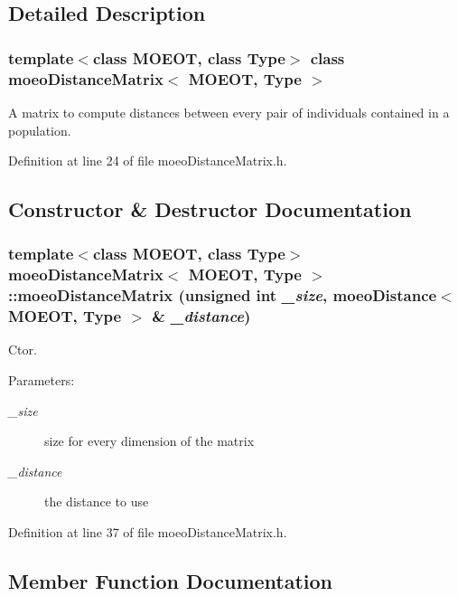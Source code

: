 \subsection{Detailed Description}
\subsubsection*{template$<$class MOEOT, class Type$>$ class moeo\-Distance\-Matrix$<$ MOEOT, Type $>$}

A matrix to compute distances between every pair of individuals contained in a population. 



Definition at line 24 of file moeo\-Distance\-Matrix.h.

\subsection{Constructor \& Destructor Documentation}
\subsubsection{\setlength{\rightskip}{0pt plus 5cm}template$<$class MOEOT, class Type$>$ \bf{moeo\-Distance\-Matrix}$<$ MOEOT, Type $>$::\bf{moeo\-Distance\-Matrix} (unsigned int {\em \_\-size}, \bf{moeo\-Distance}$<$ MOEOT, Type $>$ \& {\em \_\-distance})\hspace{0.3cm}{\tt  [inline]}}\label{classmoeoDistanceMatrix_5526260bd46b6877abd700a15b9b9ee8}


Ctor. 

\begin{Desc}
\item[Parameters:]
\begin{description}
\item[{\em \_\-size}]size for every dimension of the matrix \item[{\em \_\-distance}]the distance to use \end{description}
\end{Desc}


Definition at line 37 of file moeo\-Distance\-Matrix.h.

\subsection{Member Function Documentation}

